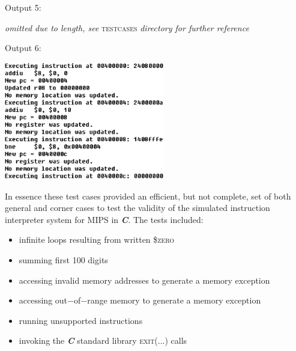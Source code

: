 \documentclass[12pt]{article}
\begin{document}
{Output 5:
\begin{center}
\textit{omitted due to length, see} \textsc{test}\underline{\hspace{.3cm}}\textsc{cases} \textit{directory for further reference}
\end{center}
Output 6:
\begin{center}
\includegraphics[width=70mm]{output6.png}
\end{center}
In essence these test cases provided an efficient, but not complete, set of both general and corner cases to test the validity of the simulated instruction interpreter system for \textsc{MIPS} in \textbf{\textit{C}}. The tests included:\begin{itemize}
\item infinite loops resulting from written \$\textsc{zero}
\item summing first 100 digits 
\item accessing invalid memory addresses to generate a memory exception
\item accessing out$-$of$-$range memory to generate a memory exception
\item running unsupported instructions
\item invoking the \textbf{\textit{C}} standard library \textsc{exit(...)} calls
\end{itemize} 
}
\end{document}
